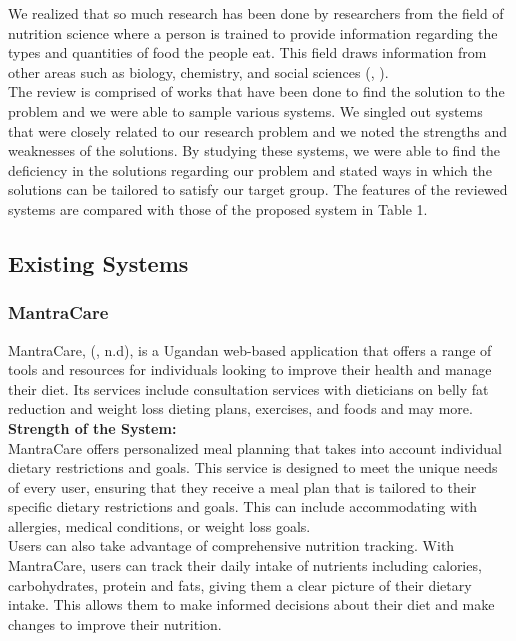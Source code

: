 \documentclass {article}
\begin{document}
\noindent We realized that so much research has been done by researchers from the field of nutrition science where a person is trained to provide information regarding the types and quantities of food the people eat. This field draws information from other areas such as biology, chemistry, and social sciences (\citeauthor{sriram2020hire}, \citeyear{sriram2020hire}).\\

\noindent The review is comprised of works that have been done to find the solution to the problem and we were able to sample various systems. We singled out systems that were closely related to our research problem and we noted the strengths and weaknesses of the solutions. By studying these systems, we were able to find the deficiency in the solutions regarding our problem and stated ways in which the solutions can be tailored to satisfy our target group. The features of the reviewed systems are compared with those of the proposed system in Table 1.\\

\subsection{Existing Systems}

\subsubsection{MantraCare}

\noindent MantraCare, (, n.d), is a Ugandan web-based application that offers a range of tools and resources for individuals looking to improve their health and manage their diet. Its services include consultation services with dieticians on belly fat reduction and weight loss dieting plans, exercises, and foods and may more.\\

\noindent \textbf{Strength of the System: \\}
\noindent MantraCare offers personalized meal planning that takes into account individual dietary restrictions and goals. This service is designed to meet the unique needs of every user, ensuring that they receive a meal plan that is tailored to their specific dietary restrictions and goals. This can include accommodating with allergies, medical conditions, or weight loss goals.\\

\noindent Users can also take advantage of comprehensive nutrition tracking. With MantraCare, users can track their daily intake of nutrients including calories, carbohydrates, protein and fats, giving them a clear picture of their dietary intake. This allows them to make informed decisions about their diet and make changes to improve their nutrition.\\
\end{document}
